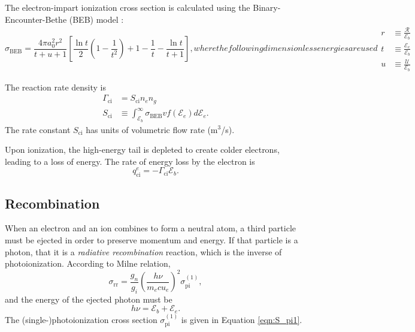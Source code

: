 The electron-impart ionization cross section is calculated using the Binary-Encounter-Bethe (BEB) model \cite{StoneKim}:
\begin{subequations}
    \begin{equation}
        \sigma_{\text{BEB}} = \frac{4\pi a_0^2 r^2}{t+u+1} \left[\frac{\ln t}{2} \left(1 - \frac{1}{t^2} \right) + 1 - \frac{1}{t} - \frac{\ln t}{t + 1} \right],
    \end{equation}
    where the following dimensionless energies are used
    \begin{align}
        r &\equiv \frac{\mathcal{R}}{\mathcal{E}_b} \\
        t &\equiv \frac{\mathcal{E}_e}{\mathcal{E}_b} \\
        u &\equiv \frac{\mathcal{U}}{\mathcal{E}_b}
    \end{align}
\end{subequations}

The reaction rate density is
\begin{subequations}
    \label{eqn:gamma_ci}
    \begin{align}
        \Gamma_{\text{ci}} &= S_{\text{ci}} n_e n_g \\
        S_{\text{ci}} &\equiv \int_{\mathcal{E}_b}^{\infty} \sigma_{\text{BEB}} v f(\mathcal{E}_e) d\mathcal{E}_e.
    \end{align}    
\end{subequations}
The rate constant $S_{\text{ci}}$ has units of volumetric flow rate (m$^3$/s).

Upon ionization, the high-energy tail is depleted to create colder electrons, leading to a loss of energy. The rate of energy loss by the electron is
\begin{equation}
    \label{eqn:qe_ci}
    q^e_{\text{ci}} = -\Gamma_{\text{ci}} \mathcal{E}_b.
\end{equation}

\subsection{Recombination}
When an electron and an ion combines to form a neutral atom, a third particle must be ejected in order to preserve momentum and energy. If that particle is a photon, that it is a \textit{radiative recombination} reaction,
which is the inverse of photoionization. According to Milne relation,
\begin{equation}
    \sigma_{\text{rr}} = \frac{g_n}{g_i} \left(\frac{h\nu}{m_e c u_e} \right)^2 \sigma_{\text{pi}}^{(1)},
    \label{eqn:milne}
\end{equation}
and the energy of the ejected photon must be
\begin{equation}
    h\nu = \mathcal{E}_b + \mathcal{E}_e.
\end{equation}
The (single-)photoionization cross section $\sigma_{\text{pi}}^{(1)}$ is given in Equation \ref{eqn:S_pi1}.

